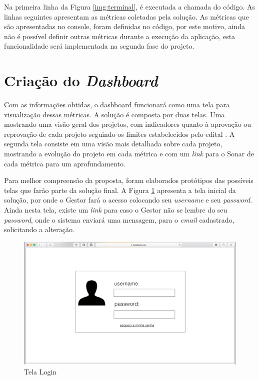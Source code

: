 Na primeira linha da Figura \ref{img:terminal}, é executada a chamada do código. As linhas seguintes apresentam as métricas coletadas pela solução. As métricas que são apresentadas no console, foram definidas no código, por este motivo, ainda não é possível definir outras métricas durante a execução da aplicação, esta funcionalidade será implementada na segunda fase do projeto. 

\section{Criação do \textit{Dashboard}}

Com as informações obtidas, o dashboard funcionará como uma tela para visualização dessas métricas. A solução é composta por duas telas. Uma mostrando uma visão geral dos projetos, com indicadores quanto à aprovação ou reprovação de cada projeto seguindo os limites estabelecidos pelo edital \cite{edital}. A segunda tela consiste em uma visão mais detalhada sobre cada projeto, mostrando a evolução do projeto em cada métrica e com um \textit{link} para o Sonar de cada métrica para um aprofundamento.

Para melhor compreensão da proposta, foram elaborados protótipos das possíveis telas que farão parte da solução final. A Figura \ref{img:telaLogin} apresenta a tela inicial da solução, por onde o Gestor fará o acesso colocando seu \textit{username} e seu \textit{password}. Ainda nesta tela, existe um \textit{link} para caso o Gestor não se lembre do seu \textit{password}, onde o sistema enviará uma mensagem, para o \textit{email} cadastrado, solicitando a alteração.

\graphicspath{{figuras/}}
\begin{figure}
\centering
\includegraphics[scale=0.60]{telaLogin.png}
\caption{Tela Login}
\label{img:telaLogin}
\end{figure}

